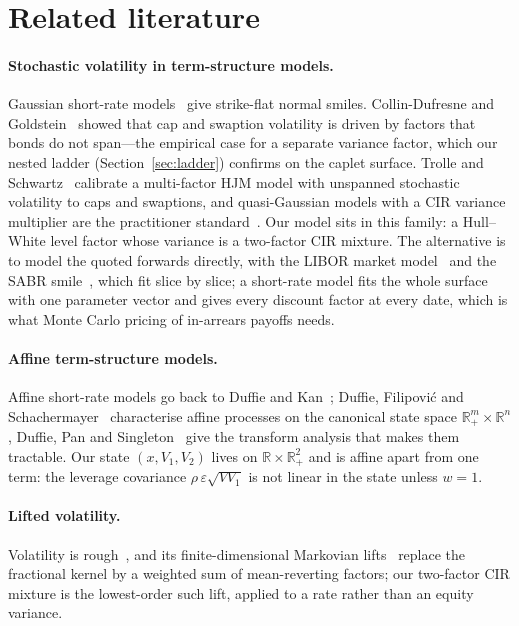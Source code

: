 \documentclass[11pt]{article}
\begin{document}
\section{Related literature}
\label{sec:lit}
\paragraph{Stochastic volatility in term-structure models.} Gaussian short-rate
models~\cite{vasicek1977,hullwhite1990} give strike-flat normal smiles.
Collin-Dufresne and Goldstein~\cite{collindufresne2002} showed that cap and swaption volatility is
driven by factors that bonds do not span---the empirical case for a separate variance factor, which
our nested ladder (Section~\ref{sec:ladder}) confirms on the caplet surface. Trolle and
Schwartz~\cite{trolleschwartz2009} calibrate a multi-factor HJM model with unspanned stochastic
volatility to caps and swaptions, and quasi-Gaussian models with a CIR variance multiplier are the
practitioner standard~\cite{andersenpiterbarg2010}. Our model sits in
this family: a Hull--White level factor whose variance is a two-factor CIR mixture. The alternative
is to model the quoted forwards directly, with the LIBOR market model~\cite{bgm1997} and the SABR
smile~\cite{hagan2002}, which fit slice by slice; a short-rate model fits the whole surface with one
parameter vector and gives every discount factor at every date, which is what Monte Carlo pricing of
in-arrears payoffs needs.

\paragraph{Affine term-structure models.} Affine short-rate models go back to Duffie and
Kan~\cite{duffiekan1996}; Duffie, Filipovi\'{c} and Schachermayer~\cite{dfs2003} characterise affine
processes on the canonical state space \(\mathbb{R}_+^m\times\mathbb{R}^n\), Duffie, Pan and
Singleton~\cite{duffie2000} give the transform analysis that makes them tractable. Our state \((x,V_1,V_2)\) lives on
\(\mathbb{R}\times\mathbb{R}_+^2\) and is affine apart from one term: the leverage covariance
\(\rho\,\varepsilon\sqrt{V V_1}\) is not linear in the state unless \(w=1\).

\paragraph{Lifted volatility.} Volatility is rough~\cite{gatheral2018}, and its finite-dimensional
Markovian lifts~\cite{abijaber2019multi,abijaber2019lifting,cuchiero2019} replace the fractional
kernel by a weighted sum of mean-reverting factors; our two-factor CIR mixture is the lowest-order
such lift, applied to a rate rather than an equity variance.
\end{document}
